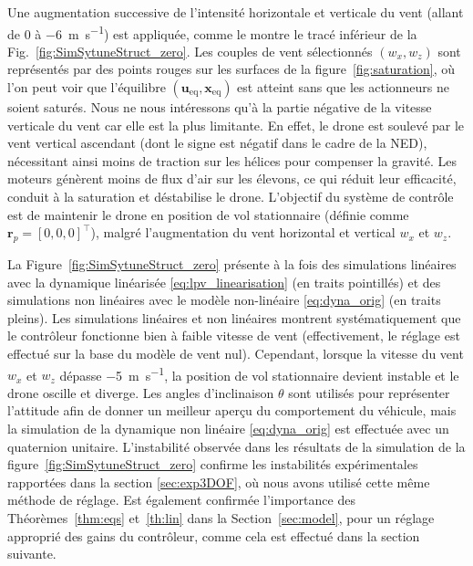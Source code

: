 Une augmentation successive de l'intensité horizontale et verticale du vent (allant de 0 à \SI{-6}{\meter\per\second}) est appliquée, comme le montre le tracé inférieur de la Fig.~\ref{fig:SimSytuneStruct_zero}. Les couples de vent sélectionnés $(w_{x}, w_{z})$ sont représentés par des points rouges sur les surfaces de la figure~\ref{fig:saturation}, où l'on peut voir que l'équilibre $(\boldsymbol{u}_{\text{eq}}, \boldsymbol{x}_{\text{eq}})$ est atteint sans que les actionneurs ne soient saturés. Nous ne nous intéressons qu'à la partie négative de la vitesse verticale du vent car elle est la plus limitante. En effet, le drone est soulevé par le vent vertical ascendant (dont le signe est négatif dans le cadre de la NED), nécessitant ainsi moins de traction sur les hélices pour compenser la gravité. Les moteurs génèrent moins de flux d'air sur les élevons, ce qui réduit leur efficacité, conduit à la saturation et déstabilise le drone.
L'objectif du système de contrôle est de maintenir le drone en position de vol stationnaire (définie comme $\boldsymbol{r}_{p} = [0,0,0]^\top$), malgré l'augmentation du vent horizontal et vertical $w_{x}$ et $w_{z}$. 


La Figure~\ref{fig:SimSytuneStruct_zero} présente à la fois des simulations linéaires avec la dynamique linéarisée \eqref{eq:lpv_linearisation} (en traits pointillés) et des simulations non linéaires avec le modèle non-linéaire \eqref{eq:dyna_orig} (en traits pleins). Les simulations linéaires et non linéaires montrent systématiquement que le contrôleur fonctionne bien à faible vitesse de vent (effectivement, le réglage est effectué sur la base du modèle de vent nul). Cependant, lorsque la vitesse du vent $w_{x}$ et $w_{z}$ dépasse \SI{-5}{\meter\per\second}, la position de vol stationnaire devient instable et le drone oscille et diverge. Les angles d'inclinaison $\theta$ sont utilisés pour représenter l'attitude afin de donner un meilleur aperçu du comportement du véhicule, mais la simulation de la dynamique non linéaire \eqref{eq:dyna_orig} est effectuée avec un quaternion unitaire. L'instabilité observée dans les résultats de la simulation de la figure~\ref{fig:SimSytuneStruct_zero} confirme les instabilités expérimentales rapportées dans la section \ref{sec:exp3DOF}, où nous avons utilisé cette même méthode de réglage. Est également confirmée l'importance des Théorèmes~\ref{thm:eqs} et~\ref{th:lin} dans la Section~\ref{sec:model}, pour un réglage approprié des gains du contrôleur, comme cela est effectué dans la section suivante.



